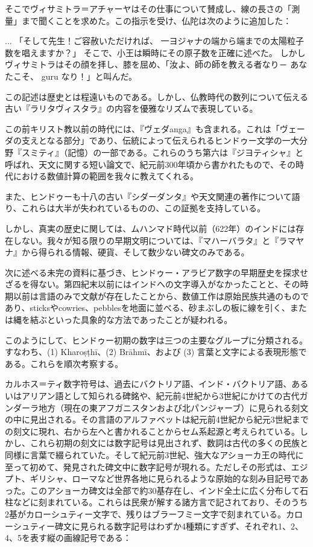 \documentclass[a4paper,11pt,openany]{ltjsbook}
\begin{document}
そこでヴィサミトラ＝アチャーヤはその仕事について賛成し、線の長さの「測量」まで聞くことを求めた。この指示を受け、仏陀は次のように追加した：

... 「そして先生！ご容赦いただければ、
 一ヨジャナの端から端までの太陽粒子数を唱えますか？」
そこで、小王は瞬時にその原子数を正確に述べた。
しかしヴィサミトラはその顔を拝し、膝を屈め、「汝よ、師の師を教える者なり－
 あなたこそ、 guru なり！」と叫んだ。

この記述は歴史とは程遠いものである。しかし、仏教時代の数列について伝える古い『ラリタヴィスタラ』の内容を優雅なリズムで表現している。

この前キリスト教以前の時代には、『ヴェダanga』も含まれる。これは「ヴェーダの支えとなる部分」であり、伝統によって伝えられるヒンドゥー文学の一大分野『スミティ』（記憶）の一部である。これらのうち第六は『ジヨティシャ』と呼ばれ、天文に関する短い論文で、紀元前300年頃から書かれたもので、その時代における数値計算の範囲を我々に教えてくれる。

また、ヒンドゥーも十八の古い『シダーダンタ』や天文関連の著作について語り、これらは大半が失われているものの、この証拠を支持している。

しかし、真実の歴史に関しては、ムハンマド時代以前（622年）のインドには存在しない。我々が知る限りの早期文明については、『マハーバラタ』と『ラマヤナ』から得られる情報、硬貨、そして数少ない碑文のみである。

次に述べる未完の資料に基づき、ヒンドゥー・アラビア数字の早期歴史を探求せざるを得ない。第四紀末以前にはインドへの文字導入がなかったことと、その時期以前は言語のみで文献が存在したことから、数値工作は原始民族共通のものであり、sticksやcowries、pebblesを地面に並べる、砂まぶしの板に線を引く、または縄を結ぶといった具象的な方法であったことが疑われる。

このようにして、ヒンドゥー初期の数字は三つの主要なグループに分類される。すなわち、(1) Kharoṣṭhī、(2) Brāhmī、および (3) 言葉と文字による表現形態である。これらを順次考察する。

カルホス＝ティ数字符号は、過去にバクトリア語、インド・バクトリア語、あるいはアリアン語として知られる碑銘や、紀元前4世紀から3世紀にかけての古代ガンダーラ地方（現在の東アフガニスタンおよび北パンジャーブ）に見られる刻文の中に見出される。その言語のアルファベットは紀元前4世紀から紀元3世紀までの刻文に現れ、右から左へと書かれることからセム系起源と考えられている。しかし、これら初期の刻文には数字記号は見出されず、数詞は古代の多くの民族と同様に言葉で綴られていた。そして紀元前3世紀、強大なアショーカ王の時代に至って初めて、発見された碑文中に数字記号が現れる。ただしその形式は、エジプト、ギリシャ、ローマなど世界各地に見られるような原始的な刻み目記号であった。このアショーカ碑文は全部で約30基存在し、インド全土に広く分布して石柱などに刻まれている。これらは民衆が解する諸方言で記されており、そのうち2基がカローシュティー文字で、残りはブラーフミー文字で刻まれている。カローシュティー碑文に見られる数字記号はわずか4種類にすぎず、それぞれ1、2、4、5を表す縦の画線記号である：
\end{document}
